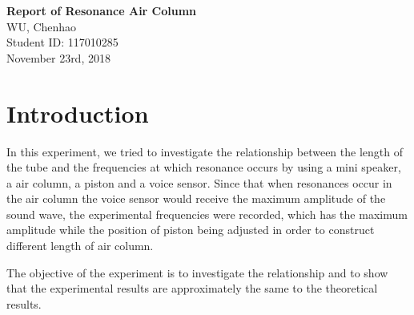 \documentclass[12pt]{article}
\begin{document}
	\begin{titlepage}
		\begin{center}
			\Large\textbf{Report of Resonance Air Column}\\
			\Large\textmd{WU, Chenhao}\\
			\Large\textmd{Student ID: 117010285}\\
			\Large\textmd{November 23rd, 2018}\\
		\end{center}
	\end{titlepage}

	\section{Introduction}
	In this experiment, we tried to investigate the relationship between the length of the tube and the frequencies at which resonance occurs by using a mini speaker, a air column, a piston and a voice sensor. Since that when resonances occur in the air column the voice sensor would receive the maximum amplitude of the sound wave, the experimental frequencies were recorded, which has the maximum amplitude while the position of piston being adjusted in order to construct different length of air column.\par 
	The objective of the experiment is to investigate the relationship and to show that the experimental results are approximately the same to the theoretical results.
	
\end{document}
